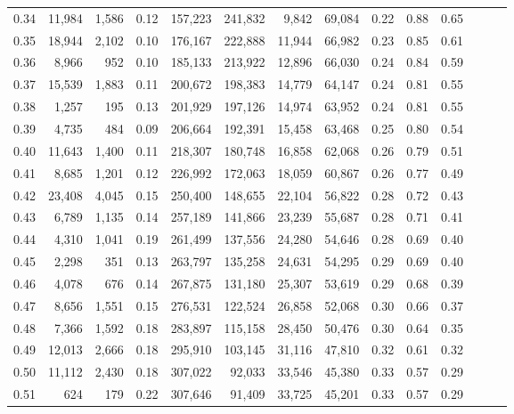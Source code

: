 \begin{tabular}{rrrrrrrrrrrrrr}
0.34 &  11,984 &  1,586 &  0.12 &  157,223 &  241,832 &   9,842 &  69,084 &  0.22 &  0.88 &      0.65 \\
0.35 &  18,944 &  2,102 &  0.10 &  176,167 &  222,888 &  11,944 &  66,982 &  0.23 &  0.85 &      0.61 \\
0.36 &   8,966 &    952 &  0.10 &  185,133 &  213,922 &  12,896 &  66,030 &  0.24 &  0.84 &      0.59 \\
0.37 &  15,539 &  1,883 &  0.11 &  200,672 &  198,383 &  14,779 &  64,147 &  0.24 &  0.81 &      0.55 \\
0.38 &   1,257 &    195 &  0.13 &  201,929 &  197,126 &  14,974 &  63,952 &  0.24 &  0.81 &      0.55 \\
0.39 &   4,735 &    484 &  0.09 &  206,664 &  192,391 &  15,458 &  63,468 &  0.25 &  0.80 &      0.54 \\
0.40 &  11,643 &  1,400 &  0.11 &  218,307 &  180,748 &  16,858 &  62,068 &  0.26 &  0.79 &      0.51 \\
0.41 &   8,685 &  1,201 &  0.12 &  226,992 &  172,063 &  18,059 &  60,867 &  0.26 &  0.77 &      0.49 \\
0.42 &  23,408 &  4,045 &  0.15 &  250,400 &  148,655 &  22,104 &  56,822 &  0.28 &  0.72 &      0.43 \\
0.43 &   6,789 &  1,135 &  0.14 &  257,189 &  141,866 &  23,239 &  55,687 &  0.28 &  0.71 &      0.41 \\
0.44 &   4,310 &  1,041 &  0.19 &  261,499 &  137,556 &  24,280 &  54,646 &  0.28 &  0.69 &      0.40 \\
0.45 &   2,298 &    351 &  0.13 &  263,797 &  135,258 &  24,631 &  54,295 &  0.29 &  0.69 &      0.40 \\
0.46 &   4,078 &    676 &  0.14 &  267,875 &  131,180 &  25,307 &  53,619 &  0.29 &  0.68 &      0.39 \\
0.47 &   8,656 &  1,551 &  0.15 &  276,531 &  122,524 &  26,858 &  52,068 &  0.30 &  0.66 &      0.37 \\
0.48 &   7,366 &  1,592 &  0.18 &  283,897 &  115,158 &  28,450 &  50,476 &  0.30 &  0.64 &      0.35 \\
0.49 &  12,013 &  2,666 &  0.18 &  295,910 &  103,145 &  31,116 &  47,810 &  0.32 &  0.61 &      0.32 \\
0.50 &  11,112 &  2,430 &  0.18 &  307,022 &   92,033 &  33,546 &  45,380 &  0.33 &  0.57 &      0.29 \\
0.51 &     624 &    179 &  0.22 &  307,646 &   91,409 &  33,725 &  45,201 &  0.33 &  0.57 &      0.29 \\

\end{tabular}
